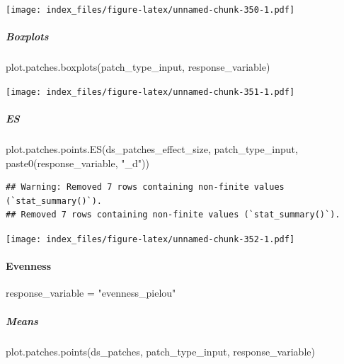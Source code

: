 \documentclass[
]{article}
\newenvironment{Shaded}{\begin{snugshade}}{\end{snugshade}}
\newcommand{\FunctionTok}[1]{\textcolor[rgb]{0.00,0.00,0.00}{#1}}
\newcommand{\NormalTok}[1]{#1}
\newcommand{\OtherTok}[1]{\textcolor[rgb]{0.56,0.35,0.01}{#1}}
\newcommand{\StringTok}[1]{\textcolor[rgb]{0.31,0.60,0.02}{#1}}
\begin{document}
\texttt{[image: index\_files/figure-latex/unnamed-chunk-350-1.pdf]}

\hypertarget{boxplots-27}{%
\subparagraph{Boxplots}\label{boxplots-27}}

\begin{Shaded}
\begin{Highlighting}[]
\FunctionTok{plot.patches.boxplots}\NormalTok{(patch\_type\_input,}
\NormalTok{                       response\_variable)}
\end{Highlighting}
\end{Shaded}

\texttt{[image: index\_files/figure-latex/unnamed-chunk-351-1.pdf]}

\hypertarget{es-11}{%
\subparagraph{ES}\label{es-11}}

\begin{Shaded}
\begin{Highlighting}[]
\FunctionTok{plot.patches.points.ES}\NormalTok{(ds\_patches\_effect\_size, patch\_type\_input,}
                       \FunctionTok{paste0}\NormalTok{(response\_variable, }\StringTok{"\_d"}\NormalTok{))}
\end{Highlighting}
\end{Shaded}

\begin{verbatim}
## Warning: Removed 7 rows containing non-finite values (`stat_summary()`).
## Removed 7 rows containing non-finite values (`stat_summary()`).
\end{verbatim}

\texttt{[image: index\_files/figure-latex/unnamed-chunk-352-1.pdf]}

\hypertarget{evenness-2}{%
\paragraph{Evenness}\label{evenness-2}}

\begin{Shaded}
\begin{Highlighting}[]
\NormalTok{response\_variable }\OtherTok{=} \StringTok{"evenness\_pielou"}
\end{Highlighting}
\end{Shaded}

\hypertarget{means-30}{%
\subparagraph{Means}\label{means-30}}

\begin{Shaded}
\begin{Highlighting}[]
\FunctionTok{plot.patches.points}\NormalTok{(ds\_patches, patch\_type\_input,}
\NormalTok{                       response\_variable)}
\end{Highlighting}
\end{Shaded}
\end{document}
